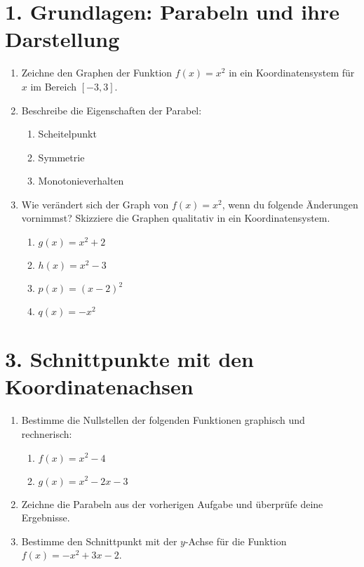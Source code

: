 \section*{1. Grundlagen: Parabeln und ihre Darstellung}
\begin{enumerate}
    \item Zeichne den Graphen der Funktion \( f(x) = x^2 \) in ein Koordinatensystem für \( x \) im Bereich \([-3,3]\).
    \item Beschreibe die Eigenschaften der Parabel:
    \begin{enumerate}
        \item Scheitelpunkt
        \item Symmetrie
        \item Monotonieverhalten
    \end{enumerate}
    \item Wie verändert sich der Graph von \( f(x) = x^2 \), wenn du folgende Änderungen vornimmst?  
    Skizziere die Graphen qualitativ in ein Koordinatensystem.
    \begin{enumerate}
        \item \( g(x) = x^2 + 2 \)
        \item \( h(x) = x^2 - 3 \)
        \item \( p(x) = (x - 2)^2 \)
        \item \( q(x) = -x^2 \)
    \end{enumerate}
\end{enumerate}




\section*{3. Schnittpunkte mit den Koordinatenachsen}
\begin{enumerate}
    \item Bestimme die Nullstellen der folgenden Funktionen graphisch und rechnerisch:
    \begin{enumerate}
        \item \( f(x) = x^2 - 4 \)
        \item \( g(x) = x^2 - 2x - 3 \)
    \end{enumerate}
    \item Zeichne die Parabeln aus der vorherigen Aufgabe und überprüfe deine Ergebnisse.
    \item Bestimme den Schnittpunkt mit der \( y \)-Achse für die Funktion \( f(x) = -x^2 + 3x - 2 \).
\end{enumerate}

